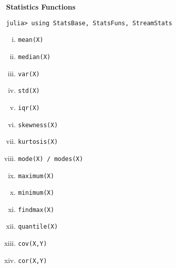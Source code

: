 \documentclass{beamer}
\begin{document}
\begin{frame}[fragile]
\textbf{Statistics Functions}
\begin{framed}
\begin{verbatim}
julia> using StatsBase, StatsFuns, StreamStats
\end{verbatim}
\end{framed}	

	\begin{multicols}{3}
		\begin{enumerate}[(i)]	
			\item \texttt{mean(X)}
			\item \texttt{median(X)}
			\item \texttt{var(X)}
			\item \texttt{std(X)}
		    \item \texttt{iqr(X)}
			\item \texttt{skewness(X)}
			\item \texttt{kurtosis(X)}
			\item \texttt{mode(X) / modes(X)}
			\item \texttt{maximum(X)}
			
			\item \texttt{minimum(X)}
			\item \texttt{findmax(X)}
			\item \texttt{quantile(X)}
				\item \texttt{cov(X,Y)}
				\item \texttt{cor(X,Y)}
		\end{enumerate}	
	\end{multicols}
\end{frame}
\end{document}
